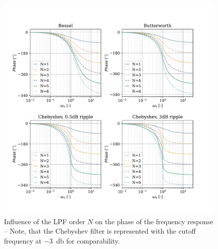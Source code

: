 \begin{figure}[!htb]
    \centering
    \includegraphics[scale=0.72]{figures/electronics/lowpass/lp_filter_pha}
    \caption[Influence of the \ac{LPF} order $N$ on the  phase of the frequency response]{Influence of the \ac{LPF} order $N$ on the  phase of the frequency response -- Note, that the Chebyshev filter is represented with the cutoff frequency at \SI{-3}{\decibel} for comparability.}
    \label{fig:lp_filter_pha}
\end{figure}

